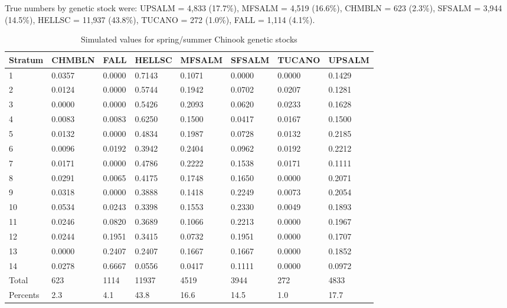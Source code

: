 \documentclass[11pt]{article}
\begin{document}
True numbers by genetic stock were: UPSALM = 4,833 (17.7\%), MFSALM = 4,519 (16.6\%), CHMBLN = 623 (2.3\%), SFSALM = 3,944 (14.5\%), HELLSC = 11,937 (43.8\%), TUCANO = 272 (1.0\%), FALL = 1,114 (4.1\%).

\begin{table}
\caption{Simulated values for spring/summer Chinook genetic stocks}
\label{table:CHsimO} 
\begin{center}
\begin{tabular}{|l|l|l|l|l|l|l|l|}
\hline Stratum&CHMBLN&FALL&HELLSC&MFSALM&SFSALM&TUCANO&UPSALM \\ \hline
1&0.0357&0.0000&0.7143&0.1071&0.0000&0.0000&0.1429 \\ \hline
2&0.0124&0.0000&0.5744&0.1942&0.0702&0.0207&0.1281 \\ \hline
3&0.0000&0.0000&0.5426&0.2093&0.0620&0.0233&0.1628 \\ \hline
4&0.0083&0.0083&0.6250&0.1500&0.0417&0.0167&0.1500 \\ \hline
5&0.0132&0.0000&0.4834&0.1987&0.0728&0.0132&0.2185 \\ \hline
6&0.0096&0.0192&0.3942&0.2404&0.0962&0.0192&0.2212 \\ \hline
7&0.0171&0.0000&0.4786&0.2222&0.1538&0.0171&0.1111 \\ \hline
8&0.0291&0.0065&0.4175&0.1748&0.1650&0.0000&0.2071 \\ \hline
9&0.0318&0.0000&0.3888&0.1418&0.2249&0.0073&0.2054 \\ \hline
10&0.0534&0.0243&0.3398&0.1553&0.2330&0.0049&0.1893 \\ \hline
11&0.0246&0.0820&0.3689&0.1066&0.2213&0.0000&0.1967 \\ \hline
12&0.0244&0.1951&0.3415&0.0732&0.1951&0.0000&0.1707 \\ \hline
13&0.0000&0.2407&0.2407&0.1667&0.1667&0.0000&0.1852 \\ \hline
14&0.0278&0.6667&0.0556&0.0417&0.1111&0.0000&0.0972 \\ \hline
Total&623&1114&11937&4519&3944&272&4833 \\ \hline
Percents&2.3&4.1&43.8&16.6&14.5&1.0&17.7 \\ \hline
\end{tabular}
\end{center}
\end{table}
\end{document}
